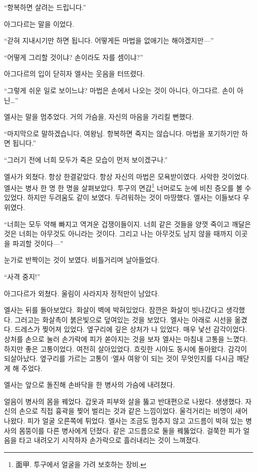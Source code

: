 ``항복하면 살려는 드립니다.''

아그다르는 말을 이었다.

``갇혀 지내시기만 하면 됩니다. 어떻게든 마법을 없애기는 해야겠지만—''

``어떻게 그리할 것이냐? 손이라도 자를 셈이냐?''

아그다르의 입이 닫히자 엘사는 웃음을 터뜨렸다.

``그렇게 쉬운 일로 보이느냐? 마법은 손에서 나오는 것이 아니다, 아그다르. 손이 아닌\ldots''

엘사는 말을 멈추었다. 거의 가슴을, 자신의 마음을 가리킬 뻔했다.

``마지막으로 말하겠습니다, 여왕님. 항복하면 죽지는 않습니다. 마법을 포기하기만 하면 됩니다.''

``그러기 전에 너희 모두가 죽은 모습이 먼저 보이겠구나.''

엘사가 외쳤다. 항상 한결같았다. 항상 자신의 마법은 모욕받이였다. 사악한 것이었다. 엘사는 병사 한 명 한 명을 살펴보았다. 투구의 면갑\footnote{面甲. 투구에서 얼굴을 가려 보호하는 장비.} 너머로도 눈에 비친 증오를 볼 수 있었다. 하지만 두려움도 같이 보였다. 두려워하는 것이 마땅했다. 엘사는 이들보다 우위였다.

``너희는 모두 약해 빠지고 역겨운 겁쟁이들이지. 너희 같은 것들을 양껏 죽이고 깨달은 것은 너희는 아무것도 아니라는 것이다. 그리고 나는 아무것도 남지 않을 때까지 이곳을 파괴할 것이다—''

눈가로 반짝이는 것이 보였다. 비틀거리며 날아들었다.

``사격 중지!''

아그다르가 외쳤다. 울림이 사라지자 정적만이 남았다.

엘사는 뒤를 돌아보았다. 화살이 벽에 박혀있었다. 잠깐은 화살이 빗나갔다고 생각했다. 그러고는 화살촉이 붉은빛으로 덮여있는 것을 보았다. 엘사는 아래로 시선을 옮겼다. 드레스가 찢어져 있었다. 옆구리에 깊은 상처가 나 있었다. 매우 낯선 감각이었다. 상처를 손으로 눌러 손가락에 피가 쏟아지는 것을 보자 엘사는 마침내 고통을 느꼈다. 하지만 좋은 고통이었다. 여전히 살아있었다. 흐릿한 시야도 동시에 돌아왔다. 감각이 되살아났다. 옆구리를 가르는 고통이 `엘사 여왕'이 되는 것이 무엇인지를 다시금 깨닫게 해 주었다.

엘사는 앞으로 돌진해 손바닥을 한 병사의 가슴에 내려쳤다.

얼음이 병사의 몸을 꿰었다. 갑옷과 피부와 살을 뚫고 반대편으로 나왔다. 생생했다. 자신의 손으로 직접 흉곽을 찢어 벌리는 것과 같은 느낌이었다. 울걱거리는 비명이 새어 나왔다. 피가 얼굴 오른쪽에 튀었다. 엘사는 조금도 멈추지 않고 고드름이 박혀 있는 병사의 몸뚱이를 다른 병사에게 던졌다. 같은 고드름으로 둘을 꿰뚫었다. 걸쭉한 피가 얼음을 타고 내려오기 시작하자 손가락으로 흘러내리는 것이 느껴졌다.

